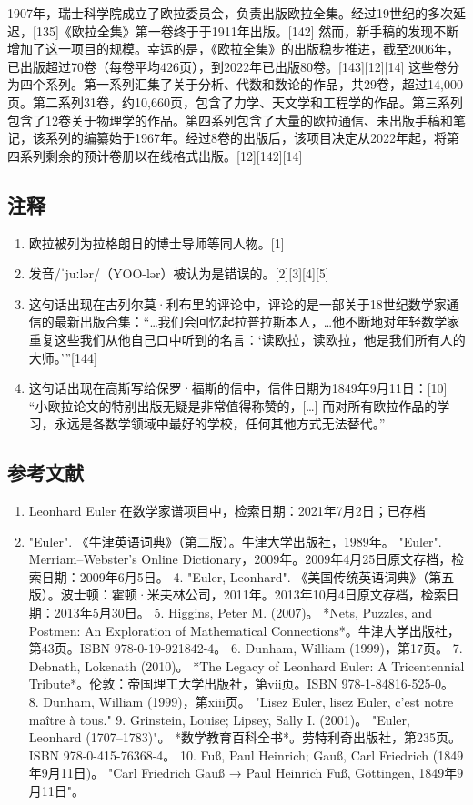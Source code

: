 1907年，瑞士科学院成立了欧拉委员会，负责出版欧拉全集。经过19世纪的多次延迟，[135]《欧拉全集》第一卷终于于1911年出版。[142] 然而，新手稿的发现不断增加了这一项目的规模。幸运的是，《欧拉全集》的出版稳步推进，截至2006年，已出版超过70卷（每卷平均426页），到2022年已出版80卷。[143][12][14] 这些卷分为四个系列。第一系列汇集了关于分析、代数和数论的作品，共29卷，超过14,000页。第二系列31卷，约10,660页，包含了力学、天文学和工程学的作品。第三系列包含了12卷关于物理学的作品。第四系列包含了大量的欧拉通信、未出版手稿和笔记，该系列的编纂始于1967年。经过8卷的出版后，该项目决定从2022年起，将第四系列剩余的预计卷册以在线格式出版。[12][142][14]
\subsection{注释}
\begin{enumerate}
\item 欧拉被列为拉格朗日的博士导师等同人物。[1]
\item 发音/ˈjuːlər/（YOO-lər）被认为是错误的。[2][3][4][5]
\item 这句话出现在古列尔莫·利布里的评论中，评论的是一部关于18世纪数学家通信的最新出版合集：“…我们会回忆起拉普拉斯本人，…他不断地对年轻数学家重复这些我们从他自己口中听到的名言：‘读欧拉，读欧拉，他是我们所有人的大师。’”[144]
\item 这句话出现在高斯写给保罗·福斯的信中，信件日期为1849年9月11日：[10] “小欧拉论文的特别出版无疑是非常值得称赞的，[…] 而对所有欧拉作品的学习，永远是各数学领域中最好的学校，任何其他方式无法替代。”
\end{enumerate}
\subsection{参考文献}
\begin{enumerate}
\item Leonhard Euler 在数学家谱项目中，检索日期：2021年7月2日；已存档  
\item "Euler". 《牛津英语词典》（第二版）。牛津大学出版社，1989年。  
"Euler". Merriam–Webster's Online Dictionary，2009年。2009年4月25日原文存档，检索日期：2009年6月5日。  
4. "Euler, Leonhard". 《美国传统英语词典》（第五版）。波士顿：霍顿·米夫林公司，2011年。2013年10月4日原文存档，检索日期：2013年5月30日。  
5. Higgins, Peter M. (2007)。 *Nets, Puzzles, and Postmen: An Exploration of Mathematical Connections*。牛津大学出版社，第43页。ISBN 978-0-19-921842-4。  
6. Dunham, William (1999)，第17页。  
7. Debnath, Lokenath (2010)。 *The Legacy of Leonhard Euler: A Tricentennial Tribute*。伦敦：帝国理工大学出版社，第vii页。ISBN 978-1-84816-525-0。  
8. Dunham, William (1999)，第xiii页。 "Lisez Euler, lisez Euler, c'est notre maître à tous."  
9. Grinstein, Louise; Lipsey, Sally I. (2001)。 "Euler, Leonhard (1707–1783)"。 *数学教育百科全书*。劳特利奇出版社，第235页。ISBN 978-0-415-76368-4。  
10. Fuß, Paul Heinrich; Gauß, Carl Friedrich (1849年9月11日)。 "Carl Friedrich Gauß → Paul Heinrich Fuß, Göttingen, 1849年9月11日"。
\end{enumerate}